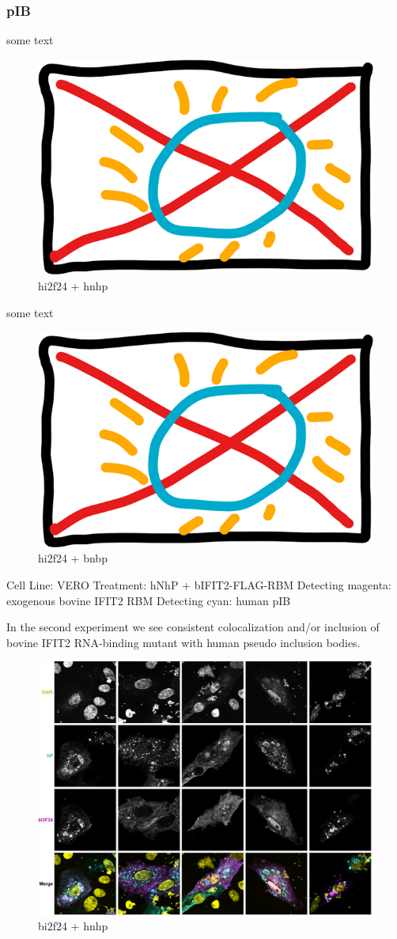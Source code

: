 \subsubsection{pIB}
some text

\begin{figure}
    \centering
    \includegraphics[width=0.5\linewidth]{10. Chapter 5//Figs//04. IFIT2-mutant confocal/00. placeholder.png}
    \caption[hi2f24 + hnhp]{hi2f24 + hnhp}
    \label{hi2f24 + hnhp}
\end{figure}


some text

\begin{figure}
    \centering
    \includegraphics[width=0.5\linewidth]{10. Chapter 5//Figs//04. IFIT2-mutant confocal/00. placeholder.png}
    \caption[hi2f24 + bnbp]{hi2f24 + bnbp}
    \label{hi2f24 + bnbp}
\end{figure}

Cell Line: VERO
Treatment: hNhP + bIFIT2-FLAG-RBM
Detecting magenta: exogenous bovine IFIT2 RBM
Detecting cyan: human pIB

In the second experiment we see consistent colocalization and/or inclusion of bovine IFIT2 RNA-binding mutant with human pseudo inclusion bodies.

\begin{figure}
    \centering
    \includegraphics[width=0.5\linewidth]{10. Chapter 5/Figs/04. IFIT2-mutant confocal/02. bi2f hnhp.png}
    \caption[bi2f24 + hnhp]{bi2f24 + hnhp}
    \label{bi2f24 + hnhp}
\end{figure}

